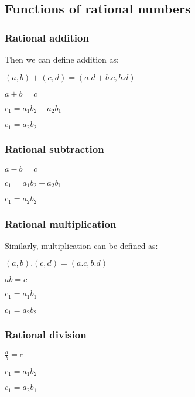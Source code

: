 \subsection{Functions of rational numbers}

\subsubsection{Rational addition}

Then we can define addition as:

\((a,b)+(c,d)=(a.d+b.c,b.d)\)

\(a+b=c\)

\(c_1=a_1b_2+a_2b_1\)

\(c_1=a_2b_2\)

\subsubsection{Rational subtraction}

\(a-b=c\)

\(c_1=a_1b_2-a_2b_1\)

\(c_1=a_2b_2\)

\subsubsection{Rational multiplication}

Similarly, multiplication can be defined as:

\((a,b).(c,d)=(a.c, b.d)\)

\(ab=c\)

\(c_1=a_1b_1\)

\(c_1=a_2b_2\)

\subsubsection{Rational division}

\(\frac{a}{b}=c\)

\(c_1=a_1b_2\)

\(c_1=a_2b_1\)

